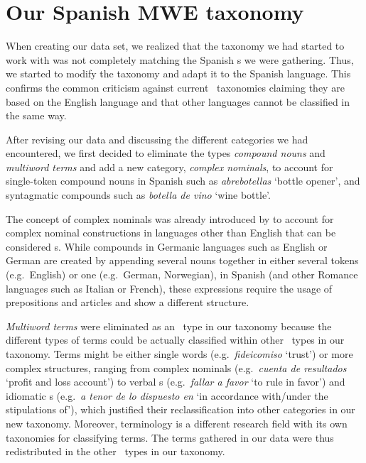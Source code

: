 \documentclass[output=paper]{langsci/langscibook}
\begin{document}
\section{Our Spanish MWE taxonomy}
\label{sec:ourTaxonomy}

When creating our data set, we realized that the taxonomy we had started to work with was not completely matching the Spanish \mwe s we were gathering. 
Thus, we started to modify the taxonomy and adapt it to the Spanish language. 
This confirms the common criticism against current \mwe\ taxonomies claiming they are based on the English language and that other languages cannot be classified in the same way. 

After revising our data and discussing the different categories we had encountered, we first decided to eliminate the types \textit{compound nouns} and \textit{multiword terms} and add a new category, \textit{complex nominals}, to account for single-token compound nouns in Spanish such as \textit{abrebotellas} `bottle opener', and syntagmatic compounds such as \textit{botella de vino} `wine bottle'.

The concept of complex nominals was already introduced by \citet{Atkins:2001} to account for complex nominal constructions in languages other than English that can be considered \mwe s.
While compounds in Germanic languages such as  English or  German are created by appending several nouns together in either several tokens (e.g.\ English) or one (e.g.\ German, Norwegian), in Spanish (and other Romance languages such as Italian or French), these expressions require the usage of prepositions and articles and show a different structure. 

\textit{Multiword terms} were eliminated as an \mwe\ type in our taxonomy because the different types of terms could be actually classified within other \mwe\ types in our taxonomy.
Terms might be either single words (e.g.\ \textit{fideicomiso} `trust') or more complex structures, ranging from complex nominals (e.g.\ \textit{cuenta de resultados} `profit and loss account') to verbal \mwe s (e.g.\ \textit{fallar a favor} `to rule in favor') and idiomatic \mwe s (e.g.\ \textit{a tenor de lo dispuesto en} `in accordance with/under the stipulations of'), which justified their reclassification into other categories in our new taxonomy.
Moreover, terminology is a different research field with its own taxonomies for classifying terms.
The terms gathered in our data were thus redistributed in the other \mwe\ types in our taxonomy.
\end{document}
